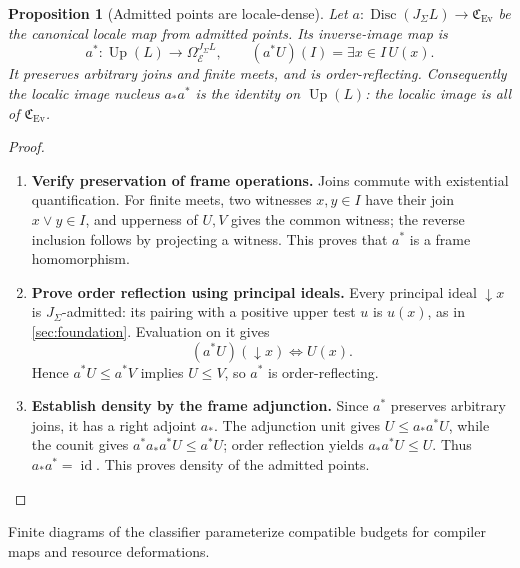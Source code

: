 \documentclass[11pt,a4paper]{article}
\numberwithin{algorithm}{section}
\numberwithin{equation}{section}
\newtheorem{proposition}[proposition]{Proposition}
\theoremstyle{definition}
\theoremstyle{remark}
\theoremstyle{plain}
\newcommand{\E}{\mathcal E}
\newcommand{\Truth}{\Omega_{\E}}
\newcommand{\J}{J_{\Sigma}}
\newcommand{\id}{\operatorname{id}}
\newcommand{\Ev}{{\operatorname{Ev}}}
\newcommand{\Cplx}{\mathfrak C_{\Ev}}
\newcommand{\Up}{\operatorname{Up}}
\theoremstyle{definition}
\theoremstyle{plain}
\begin{document}
\begin{proposition}[Admitted points are locale-dense]
\label{prop:admitted-dense}
Let $a:\operatorname{Disc}(\J L)\to\Cplx$ be the canonical
locale map from admitted points.  Its inverse-image map is
\[
 a^*:\Up(L)\longrightarrow\Truth^{\J L},
 \qquad (a^*U)(I)=\exists x\in I\,U(x).
\]
It preserves arbitrary joins and finite meets, and is
order-reflecting.  Consequently the localic image nucleus
$a_*a^*$ is the identity on $\Up(L)$: the localic image is
all of $\Cplx$.
\end{proposition}
\begin{proof}\leavevmode
\begin{enumerate}[leftmargin=*,align=left]
\item \textbf{Verify preservation of frame operations.}
Joins commute with existential quantification.  For finite
meets, two witnesses $x,y\in I$ have their join $x\vee y\in I$,
and upperness of $U,V$ gives the common witness; the reverse
inclusion follows by projecting a witness.  This proves that
$a^*$ is a frame homomorphism.

\item \textbf{Prove order reflection using principal ideals.}
Every principal ideal $\downarrow x$ is $\J$-admitted: its
pairing with a positive upper test $u$ is $u(x)$, as in
\cref{sec:foundation}.  Evaluation on it gives
\[
 (a^*U)(\downarrow x)\iff U(x).
\]
Hence $a^*U\le a^*V$ implies $U\le V$, so $a^*$ is
order-reflecting.

\item \textbf{Establish density by the frame adjunction.}
Since $a^*$ preserves arbitrary joins, it
has a right adjoint $a_*$.  The adjunction unit gives
$U\le a_*a^*U$, while the counit gives
$a^*a_*a^*U\le a^*U$; order reflection yields
$a_*a^*U\le U$.  Thus $a_*a^*=\id$.  This proves density of the admitted points.
\end{enumerate}
\end{proof}

Finite diagrams of the classifier parameterize compatible budgets for compiler maps and resource deformations.
\end{document}
